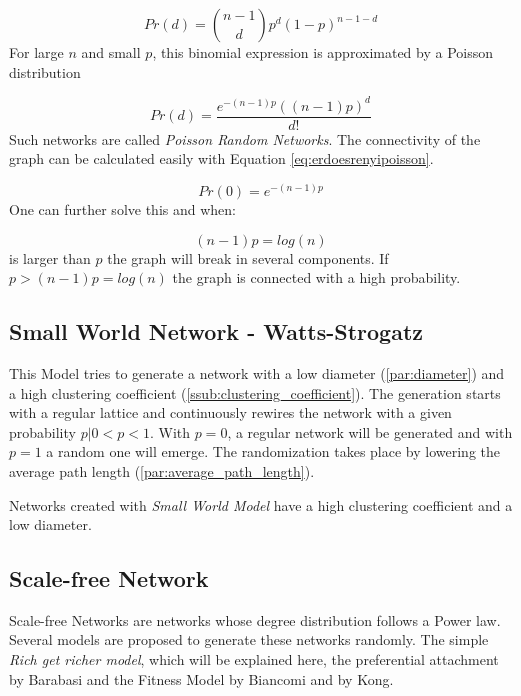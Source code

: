 \begin{equation}
\label{eq:erdoesrenyidegreedist}
	Pr(d) = \binom{n-1}{d} p^d(1-p)^{n-1-d}
\end{equation}
For large $n$ and small $p$,
this binomial expression is approximated by a Poisson distribution

\begin{equation}
\label{eq:erdoesrenyipoisson}
	Pr(d) = \frac{e^{-(n-1)p}((n-1)p)^d}{d!}
\end{equation}
Such networks are called \emph{Poisson Random Networks}.
The connectivity of the graph can be calculated easily with Equation \ref{eq:erdoesrenyipoisson}.

\begin{equation}
	Pr(0) = e^{-(n-1)p}
\end{equation}
One can further solve this and when:

\begin{equation}
	(n-1)p= log (n)
\end{equation}
is larger than $p$ the graph will break in several components.
If $p > (n-1)p= log (n)$ the graph is connected with a high probability.

\subsection[Small World Network]{Small World Network - Watts-Strogatz} %
\label{sub:watts_strogatz}
This Model tries to generate a network with a low diameter (\ref{par:diameter})
and a high clustering coefficient (\ref{ssub:clustering_coefficient}).
The generation starts with a regular lattice
and continuously rewires the network with a given probability $p | 0<p<1$.
With $p = 0$, a regular network will be generated
and with $p = 1$ a random one will emerge.
The randomization takes place by lowering the average path length (\ref{par:average_path_length}).

Networks created with \emph{Small World Model} have a high clustering coefficient
and a low diameter.

\subsection{Scale-free Network} %
\label{sub:scale_free_network}
Scale-free Networks are networks whose degree distribution follows a Power law.
Several models are proposed to generate these networks randomly.
The simple \emph{Rich get richer model},
which will be explained here,
the preferential attachment by Barabasi 
and the Fitness Model by Biancomi and by Kong.

